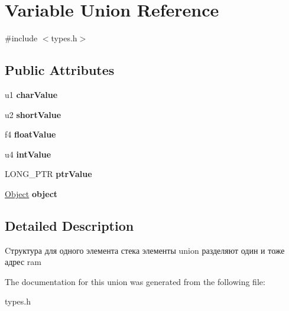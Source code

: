 \hypertarget{union_variable}{}\section{Variable Union Reference}
\label{union_variable}


{\ttfamily \#include $<$types.\+h$>$}

\subsection*{Public Attributes}
\begin{DoxyCompactItemize}
\item 
\mbox{\label{union_variable_a049e40f5545926cfe46ab9040c3742a3}} 
u1 {\bfseries char\+Value}
\item 
\mbox{\label{union_variable_ad8bb53db31a3f1ae595d23cc7a44c77b}} 
u2 {\bfseries short\+Value}
\item 
\mbox{\label{union_variable_a6c9d17fb088e6ac7eb5213fd66db2c9a}} 
f4 {\bfseries float\+Value}
\item 
\mbox{\label{union_variable_a88d99f1d5958dea8225c28072db0fdf6}} 
u4 {\bfseries int\+Value}
\item 
\mbox{\label{union_variable_a77b5920b738593ecf93f78893d5524e2}} 
L\+O\+N\+G\+\_\+\+P\+TR {\bfseries ptr\+Value}
\item 
\mbox{\label{union_variable_a145241e0af1f620aa8aca67ce9e36d14}} 
\hyperlink{struct_object}{Object} {\bfseries object}
\end{DoxyCompactItemize}


\subsection{Detailed Description}
Cтруктура для одного элемента стека элементы union разделяют один и тоже адрес ram 

The documentation for this union was generated from the following file\+:\begin{DoxyCompactItemize}
\item 
types.\+h\end{DoxyCompactItemize}
